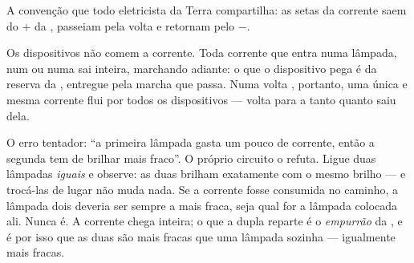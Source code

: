 \begin{omfigure}

{\small A convenção que todo eletricista da Terra compartilha: as
setas da corrente saem do $+$ da , passeiam pela volta e
retornam pelo $-$.}
\end{omfigure}

\begin{proposition}\label{prop:g7:circuits-series-parallel:notconsumed}
Os dispositivos não comem a corrente. Toda corrente que entra numa
lâmpada, num  ou numa  sai inteira, marchando adiante:
o que o dispositivo pega é \emph{} da reserva da ,
entregue pela marcha que passa. Numa volta , portanto, uma
única e mesma corrente flui por todos os dispositivos --- volta para
a  tanto quanto saiu dela.
\end{proposition}

\begin{example}\label{ex:g7:circuits-series-parallel:trial}
O erro tentador: ``a primeira lâmpada gasta um pouco de corrente,
então a segunda tem de brilhar mais fraco''. O próprio circuito o
refuta. Ligue duas lâmpadas \emph{iguais}  e observe: as duas
brilham exatamente com o mesmo brilho --- e trocá-las de lugar não
muda nada. Se a corrente fosse consumida no caminho, a lâmpada dois
deveria ser sempre a mais fraca, seja qual for a lâmpada colocada
ali. Nunca é. A corrente chega inteira; o que a dupla reparte é o
\emph{empurrão} da , e é por isso que as duas são mais fracas
que uma lâmpada sozinha --- igualmente mais fracas.
\end{example}

